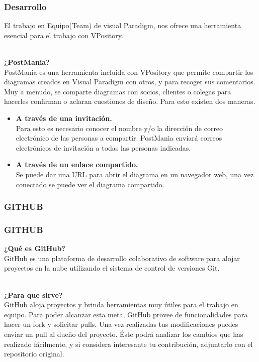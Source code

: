 \documentclass[8pt]{beamer}
\begin{document}
\begin{frame}
\frametitle{Desarrollo}
El trabajo en Equipo(Team) de visual Paradigm, nos ofrece una herramienta esencial para el trabajo con VPository.\\\

\textbf{¿PostMania?}\\

PostMania es una herramienta incluida con VPository que permite compartir los diagramas creados en Visual Paradigm con otros, y para recoger sus comentarios. Muy a menudo, se comparte diagramas con socios, clientes o colegas para hacerles confirman o aclaran cuestiones de diseño. Para esto existen dos maneras.

\begin{itemize}
\justifying
\item{\textbf{A través de una invitación.} }\\

Para esto es necesario conocer el nombre y/o la dirección de correo electrónico de las personas a compartir. PostMania enviará correos electrónicos de invitación a todas las personas indicadas.\\

\justifying
\item{ \textbf{A través de un enlace compartido.} }\\

Se puede dar una URL para abrir el diagrama en un navegador web, una vez conectado se puede ver el diagrama compartido.
\end{itemize}
\end{frame}








\subsubsection{GITHUB}
\begin{frame}
\frametitle{GITHUB}
\textbf{¿Qué es GitHub?}\\

GitHub es una plataforma de desarrollo colaborativo de software para alojar proyectos en la nube utilizando el sistema de control de versiones Git.\\\

\textbf{¿Para que sirve?}\\

GitHub aloja proyectos y brinda herramientas muy útiles para el trabajo en equipo. Para poder alcanzar esta meta, GitHub provee de funcionalidades para hacer un fork y solicitar pulls. Una vez realizadas tus modificaciones puedes enviar un pull al dueño del proyecto. Éste podrá analizar los cambios que has realizado fácilmente, y si considera interesante tu contribución, adjuntarlo con el repositorio original.
\end{frame}
\end{document}
